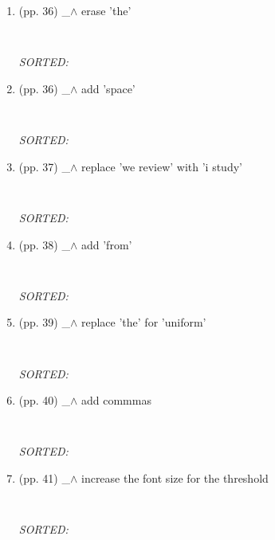 \documentclass[12pt]{article}
\begin{document}
\begin{enumerate}

\item  (pp. 36)  \_$\wedge$  
	erase 'the' 
	\begin{verbatim}
	
	\end{verbatim}
	\textit{
	SORTED:  
	}
	\\

\item  (pp. 36)  \_$\wedge$  
	add 'space'
	\begin{verbatim}
	
	\end{verbatim}
	\textit{
	SORTED:  
	}
	\\

\item  (pp. 37)  \_$\wedge$  
	replace 'we review' with 'i study'
	\begin{verbatim}
	
	\end{verbatim}
	\textit{
	SORTED:  
	}
	\\

\item  (pp. 38)  \_$\wedge$  
	add 'from'
	\begin{verbatim}
	
	\end{verbatim}
	\textit{
	SORTED:  
	}
	\\


\item  (pp. 39)  \_$\wedge$  
	replace 'the' for 'uniform'
	\begin{verbatim}
	
	\end{verbatim}
	\textit{
	SORTED:  
	}
	\\

\item  (pp. 40)  \_$\wedge$  
	add commmas
	\begin{verbatim}
	
	\end{verbatim}
	\textit{
	SORTED:  
	}
	\\

\item  (pp. 41)  \_$\wedge$  
	increase the font size for the threshold
	\begin{verbatim}
	
	\end{verbatim}
	\textit{
	SORTED:  
	}
	\\


\end{enumerate}
\end{document}
